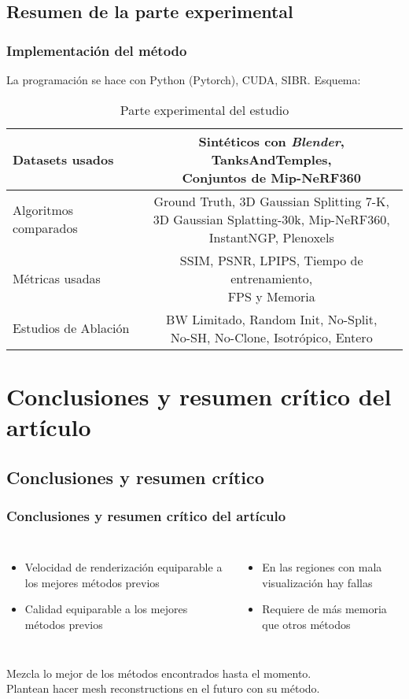 \documentclass{beamer}
\begin{document}
\subsection{Resumen de la parte experimental}

\begin{frame}
\frametitle{Implementación del método}
La programación se hace con Python (Pytorch), CUDA, SIBR.
Esquema:
\begin{table}
    \begin{tabular}{l| c}
        Datasets usados &  \makecell{Sintéticos con \textit{Blender}, \\ TanksAndTemples,  \\Conjuntos de Mip-NeRF360}\\
        \hline
        Algoritmos comparados & \makecell{Ground Truth, 3D Gaussian Splitting 7-K, \\3D Gaussian Splatting-30k, Mip-NeRF360, \\InstantNGP, Plenoxels}\\
        \hline
        Métricas usadas & \makecell{SSIM, PSNR, LPIPS, Tiempo de entrenamiento,\\FPS y Memoria}\\
        \hline
        Estudios de Ablación & \makecell{BW Limitado, Random Init, No-Split,\\No-SH, No-Clone, Isotrópico, Entero}
    \end{tabular}
    \caption{Parte experimental del estudio}
\end{table}
    
\end{frame}


\section{Conclusiones y resumen crítico del artículo}
\subsection{Conclusiones y resumen crítico}
\begin{frame}
\frametitle{Conclusiones y resumen crítico del artículo}
    \begin{columns}
    \begin{itemize}
        \item Velocidad de renderización equiparable a los mejores métodos previos
        \item Calidad equiparable a los mejores métodos previos
    \end{itemize}
    \begin{itemize}
        \item  En las regiones con mala visualización hay fallas
        \item Requiere de más memoria que otros métodos
    \end{itemize}
 
    \end{columns}
Mezcla lo mejor de los métodos encontrados hasta el momento.\\
Plantean hacer mesh reconstructions en el futuro con su método.
\end{frame}
\end{document}
